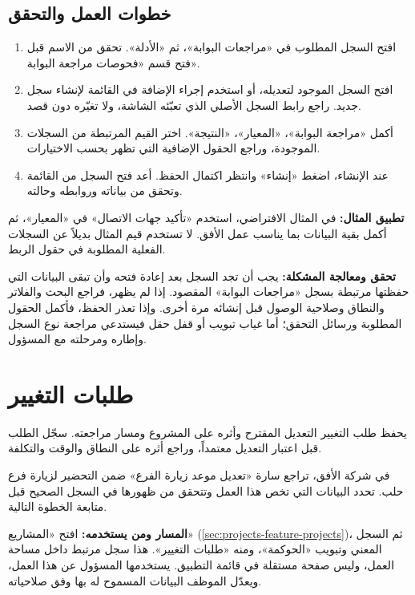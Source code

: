 \subsection{خطوات العمل والتحقق}
\begin{enumerate}
\item افتح السجل المطلوب في «مراجعات البوابة»، ثم «الأدلة». تحقق من الاسم قبل فتح قسم «فحوصات مراجعة البوابة».
\item افتح السجل الموجود لتعديله، أو استخدم إجراء الإضافة في القائمة لإنشاء سجل جديد. راجع رابط السجل الأصلي الذي تعبّئه الشاشة، ولا تغيّره دون قصد.
\item أكمل «مراجعة البوابة»، «المعيار»، «النتيجة». اختر القيم المرتبطة من السجلات الموجودة، وراجع الحقول الإضافية التي تظهر بحسب الاختيارات.
\item عند الإنشاء، اضغط «إنشاء» وانتظر اكتمال الحفظ. أعد فتح السجل من القائمة وتحقق من بياناته وروابطه وحالته.
\end{enumerate}

\textbf{تطبيق المثال:} في المثال الافتراضي، استخدم «تأكيد جهات الاتصال» في «المعيار»، ثم أكمل بقية البيانات بما يناسب عمل الأفق. لا تستخدم قيم المثال بديلاً عن السجلات الفعلية المطلوبة في حقول الربط.

\textbf{تحقق ومعالجة المشكلة:} يجب أن تجد السجل بعد إعادة فتحه وأن تبقى البيانات التي حفظتها مرتبطة بسجل «مراجعات البوابة» المقصود. إذا لم يظهر، فراجع البحث والفلاتر والنطاق وصلاحية الوصول قبل إنشائه مرة أخرى. وإذا تعذر الحفظ، فأكمل الحقول المطلوبة ورسائل التحقق؛ أما غياب تبويب أو قفل حقل فيستدعي مراجعة نوع السجل وإطاره ومرحلته مع المسؤول.

\clearpage
\section{طلبات التغيير}
\label{sec:projects-feature-change-requests}

يحفظ طلب التغيير التعديل المقترح وأثره على المشروع ومسار مراجعته. سجّل الطلب قبل اعتبار التعديل معتمداً، وراجع أثره على النطاق والوقت والتكلفة.

\begin{rcnote}
في شركة الأفق، تراجع سارة «تعديل موعد زيارة الفرع» ضمن التحضير لزيارة فرع حلب. تحدد البيانات التي تخص هذا العمل وتتحقق من ظهورها في السجل الصحيح قبل متابعة الخطوة التالية.
\end{rcnote}

\textbf{المسار ومن يستخدمه:} افتح «المشاريع» (\ref{sec:projects-feature-projects})، ثم السجل المعني وتبويب «الحوكمة»، ومنه «طلبات التغيير». هذا سجل مرتبط داخل مساحة العمل، وليس صفحة مستقلة في قائمة التطبيق. يستخدمها المسؤول عن هذا العمل، ويعدّل الموظف البيانات المسموح له بها وفق صلاحياته.

